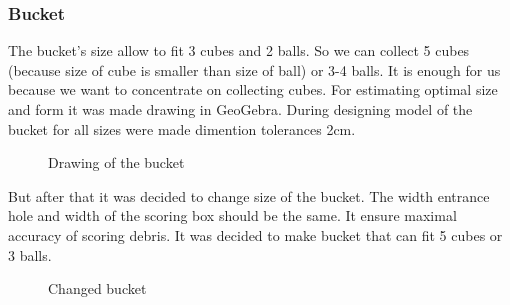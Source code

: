 \subsubsection{Bucket} 
The bucket's size allow to fit 3 cubes and 2 balls. So we can collect 5 cubes (because size of cube is smaller than size of ball) or 3-4 balls. It is enough for us because we want to concentrate on collecting cubes. 	\newline
For estimating optimal size and form it was made drawing in GeoGebra. During designing model of the bucket for all sizes were made dimention tolerances 2cm.
\begin{figure}[H]
	\begin{minipage}[h]{1\linewidth}
		\caption{Drawing of the bucket}
	\end{minipage}
\end{figure} 
But after that it was decided to change size of the bucket. The width entrance hole and width of the scoring box should be the same. It ensure maximal accuracy of scoring debris. It was decided to make bucket that can fit 5 cubes or 3 balls.
\begin{figure}[H]
	\begin{minipage}[h]{1\linewidth}
		\caption{Changed bucket}
	\end{minipage}
\end{figure}



